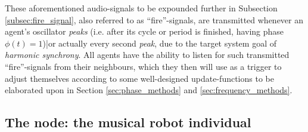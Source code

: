 	These aforementioned audio-signals to be expounded further in Subsection \ref{subsec:fire_signal}, also referred to as ``fire''-signals, are transmitted whenever an agent's oscillator \textit{peaks} (i.e. after its cycle or period is finished, having phase $\phi(t)=1$)|or actually every second \textit{peak}, due to the target system goal of \textit{harmonic synchrony}. All agents have the ability to listen for such transmitted ``fire''-signals from their neighbours, which they then will use as a trigger to adjust themselves according to some well-designed update-functions to be elaborated upon in Section \ref{sec:phase_methods} and \ref{sec:frequency_methods}.




	
	\subsection{The node: the musical robot individual}
	\label{subsec:node}
		
